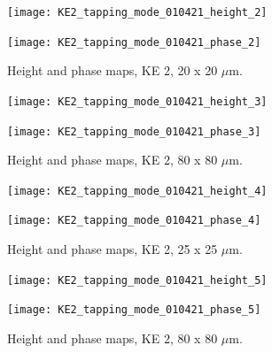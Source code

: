 \begin{figure}[H]
\centering
\begin{minipage}{.45\textwidth}
  \centering
  \texttt{[image: KE2\_tapping\_mode\_010421\_height\_2]}
\end{minipage}
\begin{minipage}{.45\textwidth}
  \centering
  \texttt{[image: KE2\_tapping\_mode\_010421\_phase\_2]}
\end{minipage}
\caption[Height and phase maps, KE 2]{Height and phase maps, KE 2, 20 x 20 $\mu$m.}
\label{fig:afm_ke2_height_phase_2}
\end{figure}


\begin{figure}[H]
\centering
\begin{minipage}{.45\textwidth}
  \centering
  \texttt{[image: KE2\_tapping\_mode\_010421\_height\_3]}
\end{minipage}
\begin{minipage}{.45\textwidth}
  \centering
  \texttt{[image: KE2\_tapping\_mode\_010421\_phase\_3]}
\end{minipage}
\caption[Height and phase maps, KE 2]{Height and phase maps, KE 2, 80 x 80 $\mu$m.}
\label{fig:afm_ke2_height_phase_3}
\end{figure}


\begin{figure}[H]
\centering
\begin{minipage}{.45\textwidth}
  \centering
  \texttt{[image: KE2\_tapping\_mode\_010421\_height\_4]}
\end{minipage}
\begin{minipage}{.45\textwidth}
  \centering
  \texttt{[image: KE2\_tapping\_mode\_010421\_phase\_4]}
\end{minipage}
\caption[Height and phase maps, KE 2]{Height and phase maps, KE 2, 25 x 25 $\mu$m.}
\label{fig:afm_ke2_height_phase_4}
\end{figure}


\begin{figure}[H]
\centering
\begin{minipage}{.45\textwidth}
  \centering
  \texttt{[image: KE2\_tapping\_mode\_010421\_height\_5]}
\end{minipage}
\begin{minipage}{.45\textwidth}
  \centering
  \texttt{[image: KE2\_tapping\_mode\_010421\_phase\_5]}
\end{minipage}
\caption[Height and phase maps, KE 2]{Height and phase maps, KE 2, 80 x 80 $\mu$m.}
\label{fig:afm_ke2_height_phase_5}
\end{figure}


